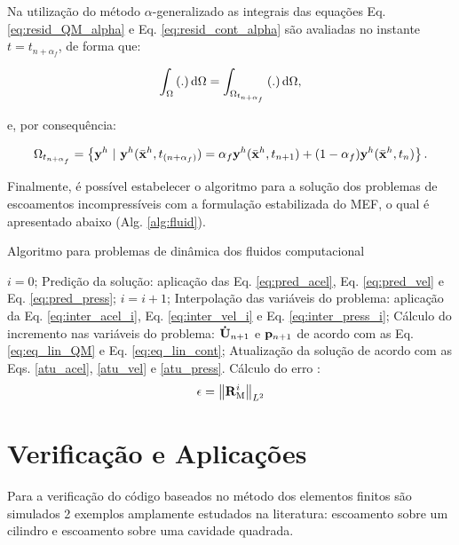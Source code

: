 \documentclass[tese_patricia]{subfiles}%
\begin{document}
Na utilização do método $\alpha$-generalizado as integrais das equações Eq. \eqref{eq:resid_QM_alpha} e Eq. \eqref{eq:resid_cont_alpha} são avaliadas no instante $t = t_{n+\alpha_{f}}$, de forma que:

\begin{align}
\int_{\Omega} \left(.\right) \mathrm{d} \Omega = \int_{\Omega_{t_{n+\alpha_{f}}}} \left(.\right) \mathrm{d} \Omega,
\end{align}

\noindent e, por consequência:

\begin{align}
\Omega_{t_{n+\alpha_{f}}} = \left\{\mathbf{y}^h \  |\  \mathbf{y}^h(\bar{\mathbf{x}}^h,t_{(n+\alpha_f)}) = \alpha_f \mathbf{y}^h(\bar{\mathbf{x}}^h,t_{n+1}) + (1-\alpha_f) \mathbf{y}^h(\bar{\mathbf{x}}^h,t_n)  \right\}.
\end{align}

Finalmente, é possível estabelecer o algoritmo para a solução dos problemas de escoamentos incompressíveis com a formulação estabilizada do MEF, o qual é apresentado abaixo (Alg. \ref{alg:fluid}).

\begin{algorithm}
	\caption{Algoritmo para problemas de dinâmica dos fluidos computacional}
	\label{alg:fluid}
	\begin{algorithmic}[1]
		\State $i=0$;
		\State Predição da solução: aplicação das Eq. \eqref{eq:pred_acel}, Eq. \eqref{eq:pred_vel} e Eq. \eqref{eq:pred_press};
		\State $i=i+1$;
		\State Interpolação das variáveis do problema: aplicação da Eq. \eqref{eq:inter_acel_i}, Eq. \eqref{eq:inter_vel_i} e Eq. \eqref{eq:inter_press_i};
		\State Cálculo do incremento nas variáveis do problema: $\mathbf{\dot{U}}_{n+1}$ e $\mathbf{p}_{n+1}$ de acordo com as Eq. \eqref{eq:eq_lin_QM} e Eq. \eqref{eq:eq_lin_cont};
		\State Atualização da solução de acordo com as Eqs. \eqref{atu_acel}, \eqref{atu_vel} e \eqref{atu_press}.
		\State Cálculo do erro :
		\begin{align}
		\epsilon =\left\| \mathbf{R}_\mathrm{M}^i \right\|_{L^2}
		\end{align}
		\EndWhile
		\EndFor
	\end{algorithmic}
\end{algorithm}


\section{Verificação e Aplicações} \label{capitulo:Cap2:VerApl}

Para a verificação do código baseados no método dos elementos finitos são simulados 2 exemplos amplamente estudados na literatura: escoamento sobre um cilindro e escoamento sobre uma cavidade quadrada.
\end{document}
